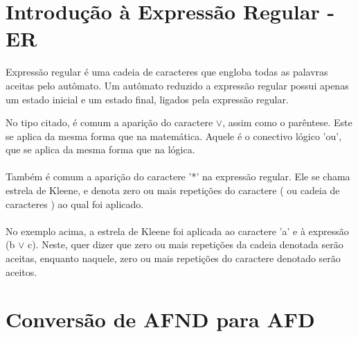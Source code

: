 \documentclass[a4paper,10pt]{article} %
\begin{document}
\newpage
\section{Introdução à Expressão Regular - ER}

Expressão regular é uma cadeia de caracteres que engloba todas as palavras aceitas pelo autômato. Um autômato reduzido a expressão regular possui apenas um estado inicial e um estado final, ligados pela expressão regular.
\begin{center}
\end{center}

No tipo citado, é comum a aparição do caractere {$\lor$}, assim como o parêntese. Este se aplica da mesma forma que na matemática. Aquele é o conectivo lógico 'ou', que se aplica da mesma forma que na lógica.\\\\Também é comum a aparição do caractere '*' na expressão regular. Ele se chama estrela de Kleene, e denota zero ou mais repetições do caractere ( ou cadeia de caracteres ) ao qual foi aplicado.\\\\No exemplo acima, a estrela de Kleene foi aplicada ao caractere 'a' e à expressão (b {$\lor$} c). Neste, quer dizer que zero ou mais repetições da cadeia denotada serão aceitas, enquanto naquele, zero ou mais repetições do caractere denotado serão aceitos.

\newpage
\section{Conversão de AFND para AFD}
\end{document}
